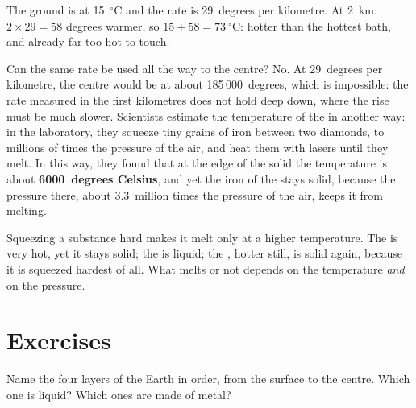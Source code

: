 \begin{example}\label{ex:g6:inside-the-earth:two-km}
The ground is at 15~$^\circ$C and the rate is 29~degrees per kilometre.
At 2~km: $2 \times 29 = 58$ degrees warmer, so $15 + 58 = 73~^\circ$C:
hotter than the hottest bath, and already far too hot to touch.
\end{example}

Can the same rate be used all the way to the centre? No. At 29~degrees per
kilometre, the centre would be at about 185\,000~degrees, which is
impossible: the rate measured in the first kilometres does not hold deep down, where the rise must be much slower. Scientists estimate the temperature
of the  in another way: in the laboratory, they squeeze tiny grains of
iron between two diamonds, to millions of times the pressure of the air,
and heat them with lasers until they melt. In this way, they found that
at the edge of the solid  the temperature is about
\textbf{6000~degrees Celsius}, and yet the iron of the  stays solid, because the pressure there, about
3.3~million times the pressure of the air, keeps it from melting.

\begin{remark}\label{rem:g6:inside-the-earth:pressure}
Squeezing a substance hard makes it melt only at a higher temperature. The
 is very hot, yet it stays solid; the  is liquid; the , hotter still, is solid again, because it is squeezed hardest of all.
What melts or not depends on the temperature \emph{and} on the pressure.
\end{remark}

\section{Exercises}

\begin{exercise}[$\star$]\label{exo:g6:inside-the-earth:1}
Name the four layers of the Earth in order, from the surface to the
centre. Which one is liquid? Which ones are made of metal?
\end{exercise}

